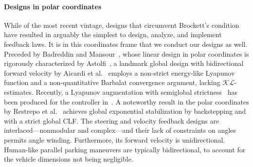 \documentclass[journal,twoside,web]{ieeecolor}
\theoremstyle{definition}
\begin{document}
\paragraph{Designs in polar coordinates} While of the most recent vintage, designs that circumvent Brockett's condition have resulted in arguably the simplest to design, analyze, and implement feedback laws. It is in this coordinates frame that we conduct our designs as well. 
Preceded by 
Badreddin and Mansour~\cite{badreddin1993fuzzy}, whose linear design in polar coordinates is rigorously characterized by  Astolfi~\cite{astolfi1999exponential}, a landmark global design with bidirectional forward velocity by Aicardi et al.~\cite{aicardi1995} %
employs a non-strict energy-like Lyapunov function and a non-quantitative Barbalat convergence argument, lacking $\mathcal{KL}$-estimates.
Recently, a Lyapunov augmentation with semiglobal strictness~\cite{wang24_force_controlled_safestable} has been produced for the controller in~\cite{aicardi1995}. 
A noteworthy result in the polar coordinates  by Restrepo et al.~\cite{restrepo2020leader}
achieves global exponential stabilization by backstepping  and with a strict global CLF. The steering and velocity feedback designs are interlaced---nonmodular and complex---and their lack of constraints on angles permits angle winding. 
Furthermore, its forward velocity is unidirectional. Human-like parallel parking maneuvers are typically bidirectional, to account for the vehicle dimensions not being negligible. 
\end{document}
